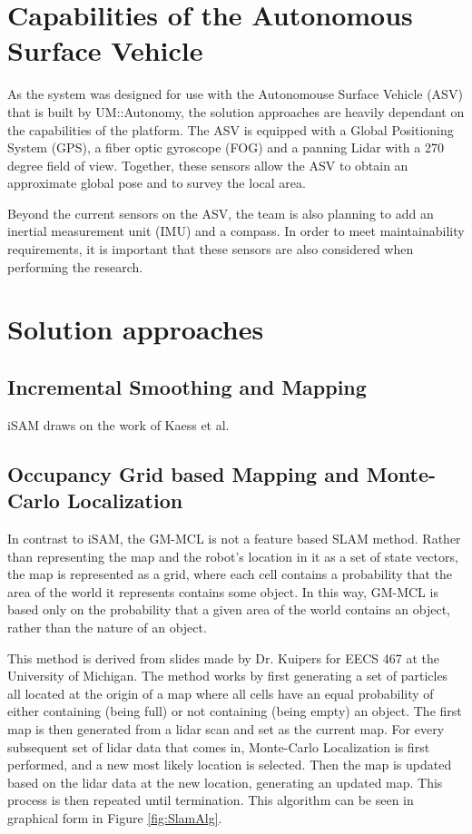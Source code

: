 \documentclass[10pt]{IEEEtran}
\begin{document}
\section{Capabilities of the Autonomous Surface Vehicle}
As the system was designed for use with the Autonomouse Surface Vehicle (ASV) that is
built by UM::Autonomy, the solution approaches are heavily dependant on the capabilities of
the platform.  The ASV is equipped with a Global Positioning System (GPS), a fiber optic 
gyroscope (FOG) and a panning Lidar with a 270 degree field of view.  Together, these sensors
allow the ASV to obtain an approximate global pose and to survey the local area.

Beyond the current sensors on the ASV, the team is also planning to add an inertial 
measurement unit (IMU) and a compass.  In order to meet maintainability requirements, it
is important that these sensors are also considered when performing the research.

\section{Solution approaches}

\subsection{Incremental Smoothing and Mapping}
iSAM draws on the work of Kaess et al.\cite{}
\cite{}

\subsection{Occupancy Grid based Mapping and Monte-Carlo Localization}
In contrast to iSAM, the GM-MCL is not a feature based SLAM method.  Rather than representing
the map and the robot's location in it as a set of state vectors, the map is represented
as a grid, where each cell contains a probability that the area of the world it represents
contains some object.  In this way, GM-MCL is based only on the probability that a given area
of the world contains an  object, rather than the nature of an object.

This method is derived from slides made by Dr. Kuipers for EECS 467 at the University of
Michigan.  The method works by first generating a set of particles all located at the origin
of a map where all cells have an equal probability of either containing (being full) or
not containing (being empty) an object.  The first map is then generated from a
lidar scan and set as the current map.  For every subsequent set of lidar data that comes in,
Monte-Carlo Localization is first performed, and a new most likely location is selected.
Then the map is updated based on the lidar data at the new location, generating an
updated map.  This process is then repeated until termination.  This algorithm
can be seen in graphical form in Figure \ref{fig:SlamAlg}. 
\end{document}
